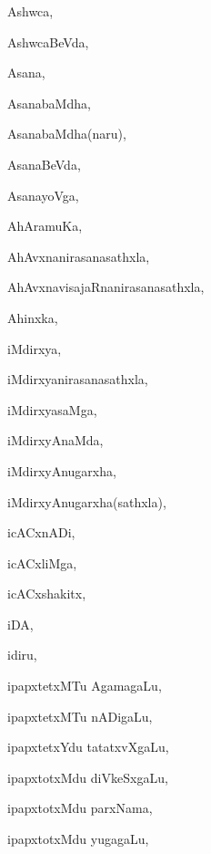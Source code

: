 \begin{multicols}{3}
{\noindent
{Ashwca}, \pageref{Ashwca}

\noindent
{AshwcaBeVda}, \pageref{AshwcaBeVda}

\noindent
{Asana}, \pageref{Asana}

\noindent
{AsanabaMdha}, \pageref{AsanabaMdha}

\noindent
{AsanabaMdha(naru)}, \pageref{AsanabaMdha(naru)}

\noindent
{AsanaBeVda}, \pageref{AsanaBeVda}

\noindent
{AsanayoVga}, \pageref{AsanayoVga}

\noindent
{AhAramuKa}, \pageref{AhAramuKa}

\noindent
{AhAvxnanirasanasathxla}, \pageref{AhAvxnanirasanasathxla}

\noindent
{AhAvxnavisajaRnanirasanasathxla}, \pageref{AhAvxnavisajaRnanirasanasathxla}

\noindent
{Ahinxka}, \pageref{Ahinxka}

\noindent
{iMdirxya}, \pageref{iMdirxya}

\noindent
{iMdirxyanirasanasathxla}, \pageref{iMdirxyanirasanasathxla}

\noindent
{iMdirxyasaMga}, \pageref{iMdirxyasaMga}

\noindent
{iMdirxyAnaMda}, \pageref{iMdirxyAnaMda}

\noindent
{iMdirxyAnugarxha}, \pageref{iMdirxyAnugarxha}

\noindent
{iMdirxyAnugarxha(sathxla)}, \pageref{iMdirxyAnugarxha(sathxla)}

\noindent
{icACxnADi}, \pageref{icACxnADi}

\noindent
{icACxliMga}, \pageref{icACxliMga}

\noindent
{icACxshakitx}, \pageref{icACxshakitx}

\noindent
{iDA}, \pageref{iDA}

\noindent
{idiru}, \pageref{idiru}

\noindent
{ipapxtetxMTu AgamagaLu}, \pageref{ipapxtetxMTu AgamagaLu}

\noindent
{ipapxtetxMTu nADigaLu}, \pageref{ipapxtetxMTu nADigaLu}

\noindent
{ipapxtetxYdu tatatxvXgaLu}, \pageref{ipapxtetxYdu tatatxvXgaLu}

\noindent
{ipapxtotxMdu diVkeSxgaLu}, \pageref{ipapxtotxMdu diVkeSxgaLu}

\noindent
{ipapxtotxMdu parxNama}, \pageref{ipapxtotxMdu parxNama}

\noindent
{ipapxtotxMdu yugagaLu}, \pageref{ipapxtotxMdu yugagaLu}

}
\end{multicols}
